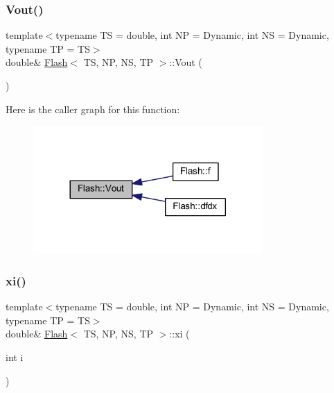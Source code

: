 \subsubsection{\texorpdfstring{Vout()}{Vout()}}
{\footnotesize\ttfamily template$<$typename TS = double, int NP = Dynamic, int NS = Dynamic, typename TP = TS$>$ \\
double\& \mbox{\hyperlink{class_flash}{Flash}}$<$ TS, NP, NS, TP $>$\+::Vout (\begin{DoxyParamCaption}{ }\end{DoxyParamCaption})\hspace{0.3cm}{\ttfamily [inline]}}

Here is the caller graph for this function\+:
\nopagebreak
\begin{figure}[H]
\begin{center}
\leavevmode
\includegraphics[width=248pt]{class_flash_a14aa681b115b9ca955ab775ff5e674e0_icgraph}
\end{center}
\end{figure}
\mbox{\label{class_flash_a289586a8a31a503bd4f96ea9455f235e}} 
\subsubsection{\texorpdfstring{xi()}{xi()}}
{\footnotesize\ttfamily template$<$typename TS = double, int NP = Dynamic, int NS = Dynamic, typename TP = TS$>$ \\
double\& \mbox{\hyperlink{class_flash}{Flash}}$<$ TS, NP, NS, TP $>$\+::xi (\begin{DoxyParamCaption}\item[{int}]{i }\end{DoxyParamCaption})\hspace{0.3cm}{\ttfamily [inline]}}

